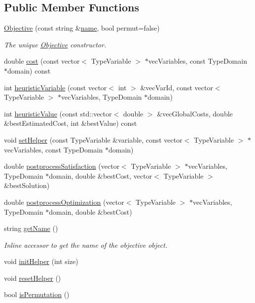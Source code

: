 \subsection*{Public Member Functions}
\begin{DoxyCompactItemize}
\item 
\hyperlink{classghost_1_1Objective_ae8f0c0e859244a5acf8e6f9a609b8e12}{Objective} (const string \&\hyperlink{classghost_1_1Objective_ae9533a52b3600c826df6e20c65db1e7a}{name}, bool permut=false)
\begin{DoxyCompactList}\small\item\em The unique \hyperlink{classghost_1_1Objective}{Objective} constructor. \end{DoxyCompactList}\item 
double \hyperlink{classghost_1_1Objective_a2947c19e26ffd2a23c3a7f1b99c8bc79}{cost} (const vector$<$ Type\-Variable $>$ $\ast$vec\-Variables, const Type\-Domain $\ast$domain) const 
\item 
int \hyperlink{classghost_1_1Objective_af68c07a226162ea7f9ee01a0b00d3ae4}{heuristic\-Variable} (const vector$<$ int $>$ \&vec\-Var\-Id, const vector$<$ Type\-Variable $>$ $\ast$vec\-Variables, Type\-Domain $\ast$domain)
\item 
int \hyperlink{classghost_1_1Objective_ac9d6c8e05cca99cd797d302b3755b6b5}{heuristic\-Value} (const std\-::vector$<$ double $>$ \&vec\-Global\-Costs, double \&best\-Estimated\-Cost, int \&best\-Value) const 
\item 
void \hyperlink{classghost_1_1Objective_ab589c264cf391bab9005562f66a39797}{set\-Helper} (const Type\-Variable \&variable, const vector$<$ Type\-Variable $>$ $\ast$vec\-Variables, const Type\-Domain $\ast$domain)
\item 
double \hyperlink{classghost_1_1Objective_a605effc6d79bd00a22c2c9fca6078cc0}{postprocess\-Satisfaction} (vector$<$ Type\-Variable $>$ $\ast$vec\-Variables, Type\-Domain $\ast$domain, double \&best\-Cost, vector$<$ Type\-Variable $>$ \&best\-Solution)
\item 
double \hyperlink{classghost_1_1Objective_a78ac0f829786f02fe69b2afe6f2636bc}{postprocess\-Optimization} (vector$<$ Type\-Variable $>$ $\ast$vec\-Variables, Type\-Domain $\ast$domain, double \&best\-Cost)
\item 
string \hyperlink{classghost_1_1Objective_adfe2130d5a472771544a4033e457c4bb}{get\-Name} ()
\begin{DoxyCompactList}\small\item\em Inline accessor to get the name of the objective object. \end{DoxyCompactList}\item 
void \hyperlink{classghost_1_1Objective_ad4432d190d227f7e67bd505f0b4b80e9}{init\-Helper} (int size)
\item 
void \hyperlink{classghost_1_1Objective_a76ca30dd5fc977963058f0c3abfe100a}{reset\-Helper} ()
\item 
bool \hyperlink{classghost_1_1Objective_a558991ad856cff48262e2848c6ab5796}{is\-Permutation} ()
\end{DoxyCompactItemize}
